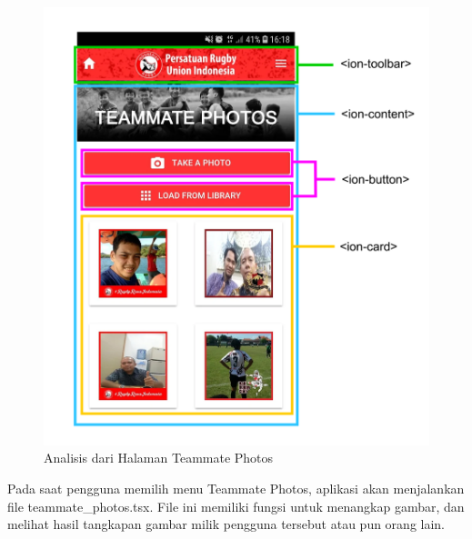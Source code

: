 \begin{figure} [H]
    \centering
    \includegraphics[scale=0.1]{Gambar/teammates_photos-analytics.png}
    \caption{Analisis dari Halaman Teammate Photos}
    \label{fig:teammate-photos-analytics}
\end{figure}

Pada saat pengguna memilih menu Teammate Photos, aplikasi akan menjalankan file teammate\_photos.tsx. File ini memiliki fungsi untuk menangkap gambar, dan melihat hasil tangkapan gambar milik pengguna tersebut atau pun orang lain.

